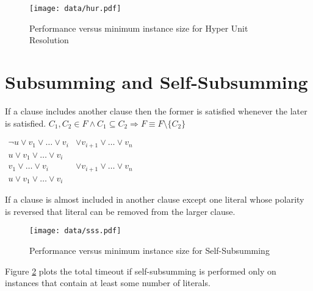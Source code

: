 \begin{figure}[h]
  \texttt{[image: data/hur.pdf]}
  \caption{Performance versus minimum instance size for Hyper Unit Resolution}
  \label{fig:hur}
\end{figure}


\section{Subsumming and Self-Subsumming}

\begin{myprop}[Subsumming]
  If a clause includes another clause then the former is satisfied whenever the
  later is satisfied.
  $C_1, C_2 \in F \land C_1 \subseteq C_2 \Rightarrow F \equiv F \setminus \{
  C_2 \}$
\end{myprop}

\begin{myprop}
  $\begin{array}{rl}
    \neg u \lor v_1 \lor \ldots \lor v_i &\lor v_{i+1} \lor \ldots \lor v_n \\
    u \lor v_1 \lor \ldots \lor v_i & \\
    \hline
    v_1 \lor \ldots \lor v_i &\lor v_{i+1} \lor \ldots \lor v_n \\
    u \lor v_1 \lor \ldots \lor v_i &
  \end{array}$

  If a clause is almost included in another clause except one literal whose
  polarity is reversed that literal can be removed from the larger clause.
\end{myprop}

\begin{figure}[h]
  \texttt{[image: data/sss.pdf]}
  \caption{Performance versus minimum instance size for Self-Subsumming}
  \label{fig:sss}
\end{figure}

Figure \ref{fig:sss} plots the total timeout if self-subsumming
is performed only on instances that contain at least some number
of literals.


